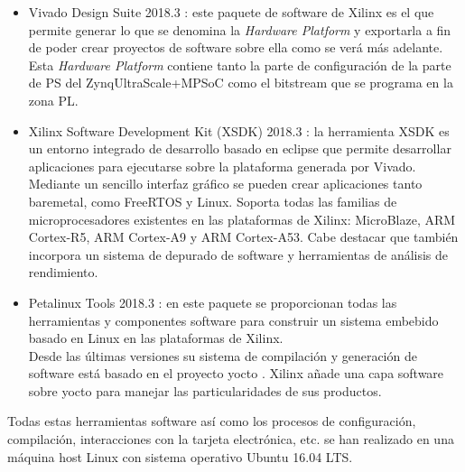 \begin{itemize}
  \item Vivado Design Suite 2018.3 \cite{vivado_suite_2018_3}: este paquete de software de Xilinx es el que permite generar lo que se denomina la \textit{Hardware Platform} y exportarla a fin de poder crear proyectos de software sobre ella como se verá más adelante. Esta \textit{Hardware Platform} contiene tanto la parte de configuración de la parte de \acrshort{PS} del Zynq\textregistered UltraScale+\texttrademark MPSoC como el bitstream que se programa en la zona \acrshort{PL}.\\

  \item Xilinx Software Development Kit (XSDK) 2018.3 \cite{xsdk_suite_2018_3}: la herramienta \acrshort{XSDK} es un entorno integrado de desarrollo basado en eclipse que permite desarrollar aplicaciones para ejecutarse sobre la plataforma generada por Vivado. Mediante un sencillo interfaz gráfico se pueden crear aplicaciones tanto baremetal, como FreeRTOS y Linux. Soporta todas las familias de microprocesadores existentes en las plataformas de Xilinx: MicroBlaze, ARM Cortex-R5, ARM Cortex-A9 y ARM Cortex-A53. Cabe destacar que también incorpora un sistema de depurado de software y herramientas de análisis de rendimiento.\\

  \item Petalinux Tools 2018.3 \cite{petalinux_suite_2018_3}: en este paquete se proporcionan todas las herramientas y componentes software para construir un sistema embebido basado en Linux en las plataformas de Xilinx.\\
  Desde las últimas versiones su sistema de compilación y generación de software está basado en el proyecto yocto \cite{yocto_project_url}. Xilinx añade una capa software sobre yocto para manejar las particularidades de sus productos.\\

\end{itemize}

Todas estas herramientas software así como los procesos de configuración, compilación, interacciones con la tarjeta electrónica, etc. se han realizado en una máquina host Linux con sistema operativo Ubuntu 16.04 LTS.
